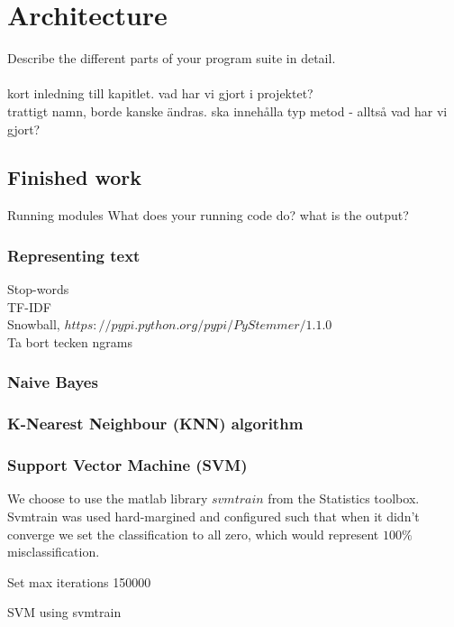 \chapter{Architecture}
Describe the different parts of your program suite in detail.
\\\\
kort inledning till kapitlet. vad har vi gjort i projektet?\\
trattigt namn, borde kanske ändras. ska innehålla typ metod - alltså vad har vi gjort?

\section{Finished work}
Running modules
What does your running code do? what is the output?
\subsection{Representing text}

Stop-words \\
TF-IDF \\
Snowball, $https://pypi.python.org/pypi/PyStemmer/1.1.0$ \\
Ta bort tecken
ngrams
\subsection{Naive Bayes}


\subsection{K-Nearest Neighbour (KNN) algorithm}

\subsection{Support Vector Machine (SVM)}
We choose to use the matlab library $svmtrain$ \citep{svmtrain_ref} from the Statistics toolbox. Svmtrain was used hard-margined and configured such that when it didn't converge we set the classification to all zero, which would represent $100\%$ misclassification. \\
\begin{algorithm}[H]
\label{algorithm:SVM}
\SetAlgoLined
{}

Set max iterations 150000 \\
 \caption{SVM using svmtrain}
\end{algorithm}



